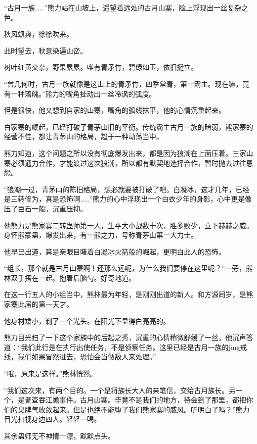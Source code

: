 
\begin{this_body}

“古月一族……”熊力站在山坡上，遥望着远处的古月山寨，脸上浮现出一丝复杂之色。

秋风飒爽，徐徐吹来。

此时望去，秋意染遍山峦。

树叶红黄交杂，野果累累。唯有青矛竹，碧绿如玉，依旧挺立。

“曾几何时，古月一族就像是这山上的青矛竹，四季常青，第一霸主。现在嘛，竟有一种落魄。”熊力的嘴角扯动出一丝冷讽的弧度。

但是很快，他又想到自家的山寨，嘴角的弧线抹平，他的心情沉重起来。

白家寨的崛起，已经打破了青茅山旧的平衡。传统霸主古月一族的暗弱，熊家寨的经营不佳，都让青茅山的格局，趋于一种动荡当中。

熊力知道，这个问题之所以没有彻底爆发出来，都是因为狼潮在上面压着。三家山寨必须通力合作，才能渡过这次狼潮，所以都有默契地选择合作，暂时抛去过往恩怨。

“狼潮一过，青茅山的陈旧格局，想必就要被打破了吧。白凝冰，这才几年，已经是三转修为，真是恐怖啊……”熊力的心中浮现出一个白衣少年的身影，心中更是像压了巨石一般，沉重压抑。

他熊力是熊家寨二转蛊师第一人，生平大小战数十次，胜多败少，立下赫赫之威。身怀熊豪蛊，爆发出来，有一熊之力，号称青茅山第一大力士。

他早已出道，算是亲眼目睹着白凝冰火箭般的崛起，更明白此人的恐怖。

“组长，那个就是古月山寨啊！还那么远呢，为什么我们要停在这里呢？”一旁，熊林双手搭在一起。抱着后脑勺。好奇地道。

在这一行五人的小组当中，熊林最为年轻，是刚刚出道的新人。和方源同岁，是熊家寨此届的第一天才。

他身材矮小，剃了一个光头。在阳光下显得白亮亮的。

熊力目光扫了一下这个家族中的后起之秀，沉重的心情稍微舒缓了一丝。他沉声答道：“我们此行是在执行出使任务，不是侦察任务。这里已经是古月一族的jing戒线，我们如果冒然进去，恐怕会当做敌人来处理。”

“哦，原来是这样。”熊林恍然。

“我们这次来，有两个目的。一个是将族长大人的亲笔信，交给古月族长。另一个，是调查吞江蟾事件。古月山寨。毕竟不是我们的地方，待会到了那里，都把你们的臭脾气收敛起来。但是也绝不能堕了我们熊家寨的威风。听明白了吗？”熊力目光扫视身边四人。轻轻一喝。

其余蛊师无不神情一凛，默默点头。


\end{this_body}
